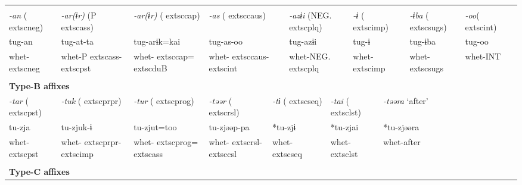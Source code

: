 \tabletail{}
\tablelasttail{}
\begin{tabularx}{\textwidth}{XXXXXXXXXXXXXXXXXXXX}
\lsptoprule
\multicolumn{20}{X}{{\bfseries Type-A affixes}}\\
{ \textit{{}-an} (	extsc{neg})} & \multicolumn{3}{X}{{ \textit{{}-ar(ɨr)} (P	extsc{ass})}} & \multicolumn{3}{X}{{ \textit{{}-ar(ɨr)} (	extsc{cap})}} & \multicolumn{4}{X}{{ \textit{{}-as} (	extsc{caus})}} & \multicolumn{4}{X}{{ \textit{{}-azɨi} (NEG.	extsc{plq})}} & \multicolumn{2}{X}{{ \textit{{}-ɨ} (	extsc{imp})}} & { \textit{{}-ɨba} (	extsc{sugs})} & { \textit{{}-oo}(	extsc{int})} & \\
{ tug-an} & \multicolumn{3}{X}{{ tug-at-ta}} & \multicolumn{3}{X}{{ tug-arɨk=kai}} & \multicolumn{4}{X}{{ tug-as-oo}} & \multicolumn{4}{X}{{ tug-azɨi}} & \multicolumn{2}{X}{{ tug-ɨ}} & { tug-ɨba} & { tug-oo} & \\
whet-	extsc{neg} & \multicolumn{3}{X}{whet-P	extsc{ass}-	extsc{pst}} & \multicolumn{3}{X}{whet-	extsc{cap}=	extsc{du}B} & \multicolumn{4}{X}{whet-	extsc{caus}-	extsc{int}} & \multicolumn{4}{X}{whet-NEG.	extsc{plq}} & \multicolumn{2}{X}{whet-	extsc{imp}} & whet-	extsc{sugs} & whet-INT & \\
\multicolumn{20}{X}{}\\
\multicolumn{20}{X}{{\bfseries Type-B affixes}}\\
{ \textit{{}-tar} (	extsc{pst})} & \multicolumn{3}{X}{{ \textit{{}-tuk} (	extsc{prpr})}} & \multicolumn{3}{X}{{ \textit{{}-tur} (	extsc{prog})}} & \multicolumn{3}{X}{{ \textit{{}-təər} (	extsc{rsl})}} & \multicolumn{3}{X}{{ \textit{{}-tɨ} (	extsc{seq})}} & \multicolumn{3}{X}{{ \textit{{}-tai} (	extsc{lst})}} & \multicolumn{4}{X}{{ \textit{{}-təəra} ‘after’}}\\
{ tu-zja} & \multicolumn{3}{X}{{ tu-zjuk-ɨ}} & \multicolumn{3}{X}{{ tu-zjut=too}} & \multicolumn{3}{X}{{ tu-zjəəp-pa}} & \multicolumn{3}{X}{{ *tu-zjɨ}} & \multicolumn{3}{X}{{ *tu-zjai}} & \multicolumn{4}{X}{{ *tu-zjəəra}}\\
whet-	extsc{pst} & \multicolumn{3}{X}{whet-	extsc{prpr}-	extsc{imp}} & \multicolumn{3}{X}{whet-	extsc{prog}=	extsc{ass}} & \multicolumn{3}{X}{whet-	extsc{rsl}-	extsc{csl}} & \multicolumn{3}{X}{whet-	extsc{seq}} & \multicolumn{3}{X}{whet-	extsc{lst}} & \multicolumn{4}{X}{{ whet-after}}\\
& \multicolumn{3}{X}{} & \multicolumn{3}{X}{} & \multicolumn{3}{X}{} & \multicolumn{3}{X}{} & \multicolumn{3}{X}{} & \multicolumn{4}{X}{}\\
\multicolumn{20}{X}{{\bfseries Type-C affixes}}\\

\end{tabularx}
